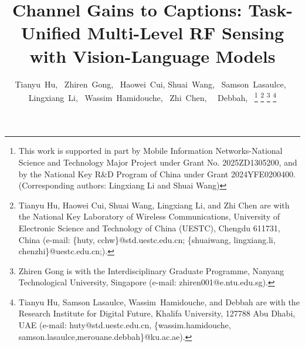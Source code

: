 \documentclass[journal,12pt,onecolumn,draftclsnofoot]{IEEEtran}
\begin{document}
\title{ Channel Gains to Captions: Task-Unified Multi-Level RF Sensing with Vision-Language Models}
\author{Tianyu~Hu,~ Zhiren~Gong,~
        Haowei~Cui, Shuai~Wang,~ Samson~Lasaulce,~ Lingxiang~Li,~ Wassim~Hamidouche,~  
        Zhi~Chen,~ ~Debbah,~
    \thanks{This work is supported in part by Mobile Information Networks-National Science and Technology Major Project under Grant No. 2025ZD1305200, and by the National Key R\&D Program of China under Grant 2024YFE0200400. (Corresponding authors: Lingxiang Li and Shuai Wang)}
    \thanks{Tianyu Hu, Haowei Cui, Shuai Wang, Lingxiang Li, and Zhi Chen are with the National Key Laboratory of Wireless Communications, University of Electronic Science and Technology of China (UESTC), Chengdu 611731, China (e-mail: \{huty, cchw\}@std.uestc.edu.cn; \{shuaiwang, lingxiang.li, chenzhi\}@uestc.edu.cn;).}
    \thanks{Zhiren Gong is with the Interdisciplinary Graduate Programme, Nanyang Technological University, Singapore (e-mail: zhiren001@e.ntu.edu.sg).}
    \thanks{Tianyu Hu, Samson Lasaulce, Wassim~Hamidouche, and  Debbah are with the Research Institute for Digital Future, Khalifa University, 127788 Abu Dhabi, UAE (e-mail: huty@std.uestc.edu.cn, \{wassim.hamidouche, samson.lasaulce,merouane.debbah\}@ku.ac.ae).}
}
\maketitle
\end{document}
